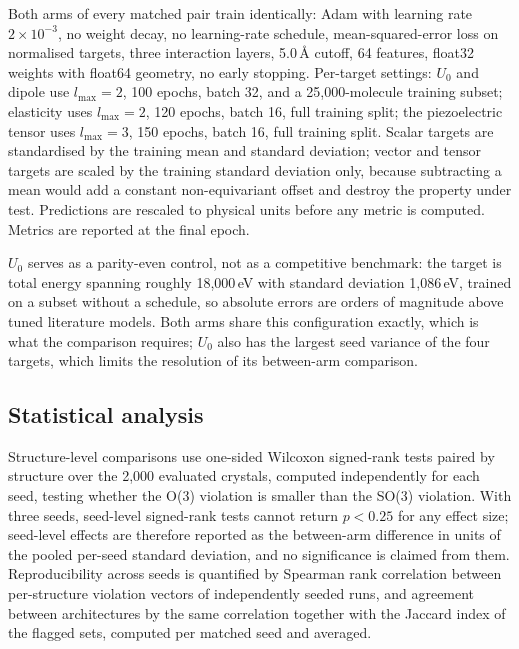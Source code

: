 Both arms of every matched pair train identically: Adam\cite{kingma2015adam} with learning rate $2\times10^{-3}$, no weight decay, no learning-rate schedule, mean-squared-error loss on normalised targets, three interaction layers, 5.0\,\AA{} cutoff, 64 features, float32 weights with float64 geometry, no early stopping. Per-target settings: $U_0$ and dipole use $l_{\max}=2$, 100 epochs, batch 32, and a 25,000-molecule training subset; elasticity uses $l_{\max}=2$, 120 epochs, batch 16, full training split; the piezoelectric tensor uses $l_{\max}=3$, 150 epochs, batch 16, full training split. Scalar targets are standardised by the training mean and standard deviation; vector and tensor targets are scaled by the training standard deviation only, because subtracting a mean would add a constant non-equivariant offset and destroy the property under test. Predictions are rescaled to physical units before any metric is computed. Metrics are reported at the final epoch.

$U_0$ serves as a parity-even control, not as a competitive benchmark: the target is total energy spanning roughly 18,000\,eV with standard deviation 1,086\,eV, trained on a subset without a schedule, so absolute errors are orders of magnitude above tuned literature models. Both arms share this configuration exactly, which is what the comparison requires; $U_0$ also has the largest seed variance of the four targets, which limits the resolution of its between-arm comparison.

\subsection*{Statistical analysis}

Structure-level comparisons use one-sided Wilcoxon signed-rank tests paired by structure over the 2,000 evaluated crystals, computed independently for each seed, testing whether the O(3) violation is smaller than the SO(3) violation. With three seeds, seed-level signed-rank tests cannot return $p<0.25$ for any effect size; seed-level effects are therefore reported as the between-arm difference in units of the pooled per-seed standard deviation, and no significance is claimed from them. Reproducibility across seeds is quantified by Spearman rank correlation between per-structure violation vectors of independently seeded runs, and agreement between architectures by the same correlation together with the Jaccard index of the flagged sets, computed per matched seed and averaged.

